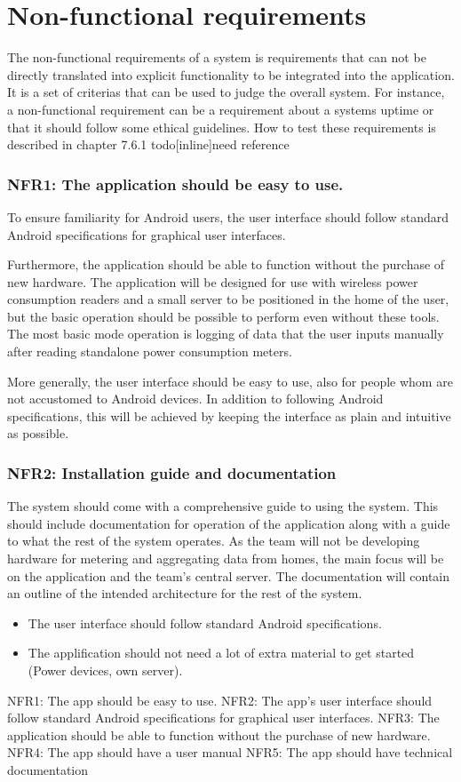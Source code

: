 \section{Non-functional requirements}
The non-functional requirements of a system is requirements that can not be directly translated into explicit functionality to be integrated into the application. It is a set of criterias that can be used to judge the overall system. For instance, a non-functional requirement can be a requirement about a systems uptime or that it should follow some ethical guidelines. How to test these requirements is described in chapter 7.6.1 todo[inline]{need reference}

\subsubsection{NFR1: The application should be easy to use.}
To ensure familiarity for Android users, the user interface should follow standard Android specifications for graphical user interfaces.
 
Furthermore, the application should be able to function without the purchase of new hardware. The application will be designed for use with wireless power consumption readers and a small server to be positioned in the home of the user, but the basic operation should be possible to perform even without these tools. The most basic mode operation is logging of data that 
the user inputs manually after reading standalone power consumption meters.
 
More generally, the user interface should be easy to use, also for people whom are not accustomed to Android devices. In 
addition to following Android specifications, this will be achieved by keeping the interface as plain and intuitive as possible.

\subsubsection{NFR2: Installation guide and documentation}
The system should come with a comprehensive guide to using the system. This should include documentation for operation of the
application along with a guide to what the rest of the system operates. As the team will not be developing hardware for metering and 
aggregating data from homes, the main focus will be on the application and the team's central server. The documentation will contain an outline 
of the intended architecture for the rest of the system.


\begin{itemize}
\item The user interface should follow standard Android specifications. 
\item The applification should not need a lot of extra material to get started (Power devices, own server).
\end{itemize}


NFR1: The app should be easy to use.
NFR2: The app’s user interface should follow standard Android specifications for graphical user interfaces. 
NFR3: The application should be able to function without the purchase of new hardware. 
NFR4: The app should have a user manual
NFR5: The app should have technical documentation
